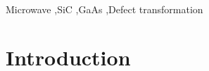 \documentclass[final,3p,times,twocolumn,authoryear]{elsarticle}
\begin{document}
\begin{frontmatter}

%
%
%
%
%

\begin{keyword}
Microwave
\sep SiC
\sep GaAs
\sep Defect transformation
\end{keyword}

\end{frontmatter}


\section{Introduction}\label{sec1}
\end{document}
